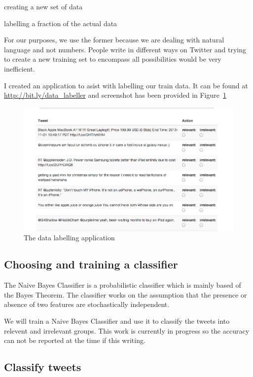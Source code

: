 \begin{enumerate*}
[label=\itshape\alph*\ushape)]
  \item creating a new set of data
  \item labelling a fraction of the actual data
\end{enumerate*}

For our purposes, we use the former because we are dealing with natural language and not numbers.
People write in different ways on Twitter and trying to create a new training set to encompass all
possibilities would be very inefficient.

I created an application to asist with labelling our train data. It can be found at
\url{http://bit.ly/data\_labeller} and screenshot has been provided in Figure~\ref{fig:labeller}

\begin{figure}
  \begin{center}
    \includegraphics[scale=0.4]{Figures/datalabeller}
  \end{center}
  \caption{The data labelling application}
\label{fig:labeller}
\end{figure}


\subsection{Choosing and training a classifier}
The Naive Bayes Classifier is a probabilistic classifier which is mainly based of the Bayes Theorem.
The classifier works on the assumption that the presence or absence of two features are
stochastically independent.

We will train a Naive Bayes Classifier and use it to classify the tweets into relevent and
irrelevant groups. This work is currently in progress so the accuracy can not be reported at the
time if this writing.

\subsection{Classify tweets}
